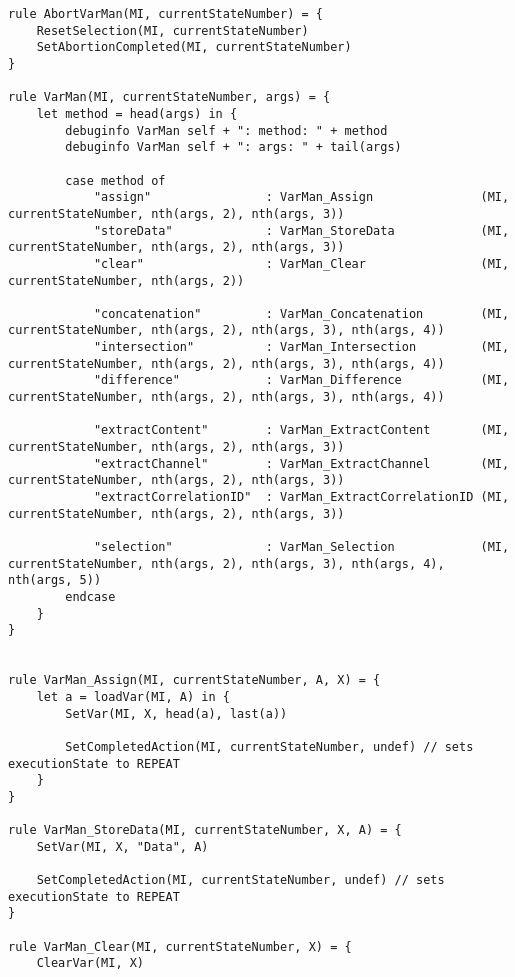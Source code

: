 \begin{listing}[H]
\begin{verbatim}
rule AbortVarMan(MI, currentStateNumber) = {
    ResetSelection(MI, currentStateNumber)
    SetAbortionCompleted(MI, currentStateNumber)
}

rule VarMan(MI, currentStateNumber, args) = {
    let method = head(args) in {
        debuginfo VarMan self + ": method: " + method
        debuginfo VarMan self + ": args: " + tail(args)

        case method of
            "assign"                : VarMan_Assign               (MI, currentStateNumber, nth(args, 2), nth(args, 3))
            "storeData"             : VarMan_StoreData            (MI, currentStateNumber, nth(args, 2), nth(args, 3))
            "clear"                 : VarMan_Clear                (MI, currentStateNumber, nth(args, 2))

            "concatenation"         : VarMan_Concatenation        (MI, currentStateNumber, nth(args, 2), nth(args, 3), nth(args, 4))
            "intersection"          : VarMan_Intersection         (MI, currentStateNumber, nth(args, 2), nth(args, 3), nth(args, 4))
            "difference"            : VarMan_Difference           (MI, currentStateNumber, nth(args, 2), nth(args, 3), nth(args, 4))

            "extractContent"        : VarMan_ExtractContent       (MI, currentStateNumber, nth(args, 2), nth(args, 3))
            "extractChannel"        : VarMan_ExtractChannel       (MI, currentStateNumber, nth(args, 2), nth(args, 3))
            "extractCorrelationID"  : VarMan_ExtractCorrelationID (MI, currentStateNumber, nth(args, 2), nth(args, 3))

            "selection"             : VarMan_Selection            (MI, currentStateNumber, nth(args, 2), nth(args, 3), nth(args, 4), nth(args, 5))
        endcase
    }
}


rule VarMan_Assign(MI, currentStateNumber, A, X) = {
    let a = loadVar(MI, A) in {
        SetVar(MI, X, head(a), last(a))

        SetCompletedAction(MI, currentStateNumber, undef) // sets executionState to REPEAT
    }
}

rule VarMan_StoreData(MI, currentStateNumber, X, A) = {
    SetVar(MI, X, "Data", A)

    SetCompletedAction(MI, currentStateNumber, undef) // sets executionState to REPEAT
}

rule VarMan_Clear(MI, currentStateNumber, X) = {
    ClearVar(MI, X)


\end{verbatim}
\end{listing}
